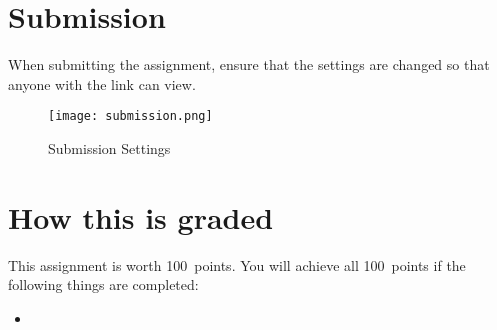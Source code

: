 \documentclass{article}
\newcommand{\AValue}{100}
\begin{document}
\section*{Submission}
When submitting the assignment, ensure that the settings are changed so that anyone with the link can view.
\begin{figure}[H]
  \centering
  \texttt{[image: submission.png]}
  \caption{Submission Settings}
\end{figure}

\section*{How this is graded}
This assignment is worth \AValue \ points. You will achieve all \AValue \   points if the following things are completed:
\begin{itemize}
    \item 
\end{itemize}
\end{document}
